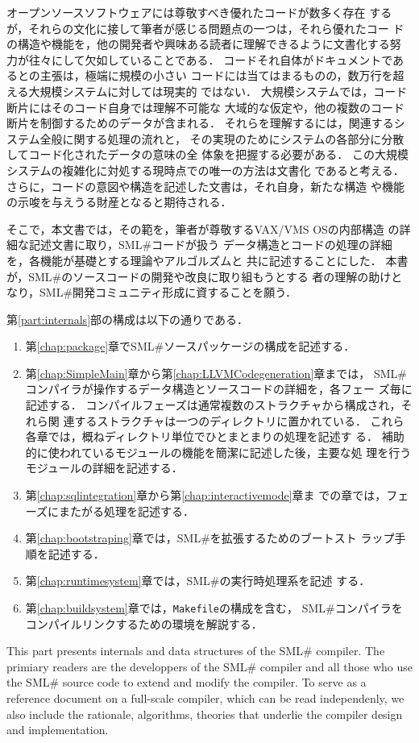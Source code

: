 \documentclass{jbook}
\newcommand{\smlsharp}{SML\#}
\newcommand{\code}[1]{\mbox{\large\tt #1}}
\begin{document}
	オープンソースソフトウェアには尊敬すべき優れたコードが数多く存在
するが，それらの文化に接して筆者が感じる問題点の一つは，それら優れたコー
ドの構造や機能を，他の開発者や興味ある読者に理解できるように文書化する努
力が往々にして欠如していることである．
	コードそれ自体がドキュメントであるとの主張は，極端に規模の小さい
コードには当てはまるものの，数万行を超える大規模システムに対しては現実的
ではない．
	大規模システムでは，コード断片にはそのコード自身では理解不可能な
大域的な仮定や，他の複数のコード断片を制御するためのデータが含まれる．
	それらを理解するには，関連するシステム全般に関する処理の流れと，
その実現のためにシステムの各部分に分散してコード化されたデータの意味の全
体象を把握する必要がある．
	この大規模システムの複雑化に対処する現時点での唯一の方法は文書化
であると考える．
	さらに，コードの意図や構造を記述した文書は，それ自身，新たな構造
や機能の示唆を与えうる財産となると期待される．

	そこで，本文書では，その範を，筆者が尊敬するVAX/VMS OSの内部構造
の詳細な記述文書\cite{Kenah:1984:VID:225}に取り，\smlsharp{}コードが扱う
データ構造とコードの処理の詳細を，各機能が基礎とする理論やアルゴルズムと
共に記述することにした．
	本書が，\smlsharp{}のソースコードの開発や改良に取り組もうとする
者の理解の助けとなり，\smlsharp{}開発コミュニティ形成に資することを願う．

	第\ref{part:internals}部の構成は以下の通りである．
\begin{enumerate}
\item 第\ref{chap:package}章で\smlsharp{}ソースパッケージの構成を記述する．
\item 
      第\ref{chap:SimpleMain}章から第\ref{chap:LLVMCodegeneration}章までは，
\smlsharp{}コンパイラが操作するデータ構造とソースコードの詳細を，各フェー
ズ毎に記述する．
	コンパイルフェーズは通常複数のストラクチャから構成され，それら関
連するストラクチャは一つのディレクトリに置かれている．
	これら各章では，概ねディレクトリ単位でひとまとまりの処理を記述す
る． 
	補助的に使われているモジュールの機能を簡潔に記述した後，主要な処
理を行うモジュールの詳細を記述する．
\item 第\ref{chap:sqlintegration}章から第\ref{chap:interactivemode}章ま
での章では，フェーズにまたがる処理を記述する．
\item 第\ref{chap:bootstraping}章では，\smlsharp{}を拡張するためのブートスト
ラップ手順を記述する．
\item 第\ref{chap:runtimesystem}章では，\smlsharp{}の実行時処理系を記述
する．
\item 第\ref{chap:buildsystem}章では，\code{Makefile}の構成を含む，
\smlsharp{}コンパイラをコンパイルリンクするための環境を解説する．
\end{enumerate}
\else%
	This part presents internals and data structures of the
\smlsharp{} compiler.
	The primiary readers are the developpers of the \smlsharp{}
compiler and all those who use the \smlsharp{} source code to extend and
modify the compiler. 
	To serve as a reference document on a full-scale compiler, which
can be read independenly, we also include the rationale, algorithms,
theories that underlie the compiler design and implementation. 
\end{document}
